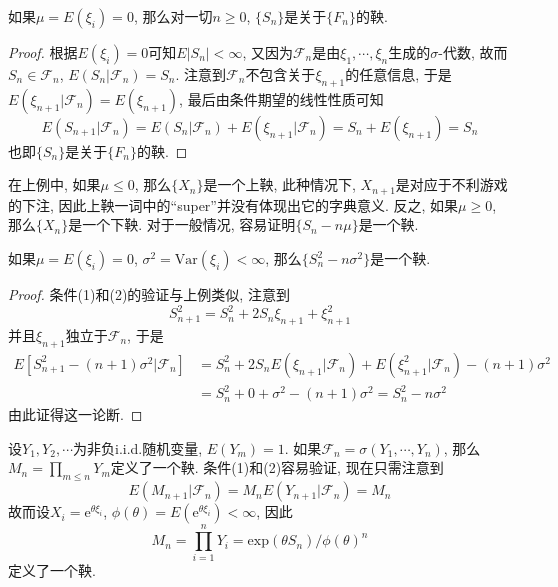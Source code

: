 \documentclass[cn, 12pt, math=mtpro2, bibstyle=apa, blue, twocol]{elegantbook}
\newcommand{\F}{\mathcal{F}}
\newcommand{\var}{\text{Var}}
\begin{document}
\begin{example}[线性鞅]
如果$\mu=E(\xi_i)=0$, 那么对一切$n\ge0$, $\{S_n\}$是关于$\{F_n\}$的鞅.
\end{example}
\begin{proof}
  根据$E(\xi_i)=0$可知$E|S_n|<\infty$, 又因为$\F_n$是由$\xi_1,\cdots,\xi_n$生成的$\sigma$-代数, 故而$S_n\in\F_n$, $E(S_n|\F_n)=S_n$. 注意到$\F_n$不包含关于$\xi_{n+1}$的任意信息, 于是$E(\xi_{n+1}|\F_n)=E(\xi_{n+1})$, 最后由条件期望的线性性质可知
  $$E(S_{n+1}|\F_n)=E(S_n|\F_n)+E(\xi_{n+1}|\F_n)=S_n+E(\xi_{n+1})=S_n$$
  也即$\{S_n\}$是关于$\{F_n\}$的鞅.
\end{proof}
在上例中, 如果$\mu\leq0$, 那么$\{X_n\}$是一个上鞅, 此种情况下, $X_{n+1}$是对应于不利游戏的下注, 因此上鞅一词中的“super”并没有体现出它的字典意义. 反之, 如果$\mu\ge0$, 那么$\{X_n\}$是一个下鞅. 对于一般情况, 容易证明$\{S_n-n\mu\}$是一个鞅.
\begin{example}[二次鞅]
如果$\mu=E(\xi_i)=0$, $\sigma^2=\var(\xi_i)<\infty$, 那么$\{S_n^2-n\sigma^2\}$是一个鞅.
\end{example}
\begin{proof}
  条件(1)和(2)的验证与上例类似, 注意到
  $$S_{n+1}^2=S_n^2+2S_n\xi_{n+1}+\xi_{n+1}^2$$
  并且$\xi_{n+1}$独立于$\F_n$, 于是
  \begin{align*}
  E[S_{n+1}^2-(n+1)\sigma^2|\F_n]&=S_n^2+2S_nE(\xi_{n+1}|\F_n)+E(\xi_{n+1}^2|\F_n)-(n+1)\sigma^2 \\
  &=S_n^2+0+\sigma^2-(n+1)\sigma^2=S_n^2-n\sigma^2
  \end{align*}
  由此证得这一论断.
\end{proof}
\begin{example}[指数鞅]
设$Y_1,Y_2,\cdots$为非负i.i.d.随机变量, $E(Y_m)=1$. 如果$\F_n=\sigma(Y_1,\cdots,Y_n)$, 那么$M_n=\prod_{m\leq n}Y_m$定义了一个鞅. 条件(1)和(2)容易验证, 现在只需注意到
$$E(M_{n+1}|\F_n)=M_nE(Y_{n+1}|\F_n)=M_n$$
故而设$X_i=\text{e}^{\theta\xi_i}$, $\phi(\theta)=E(\text{e}^{\theta\xi_i})<\infty$, 因此
$$M_n=\prod_{i=1}^{n}Y_i=\text{exp}(\theta S_n)/\phi(\theta)^n$$
定义了一个鞅.
\end{example}
\end{document}
